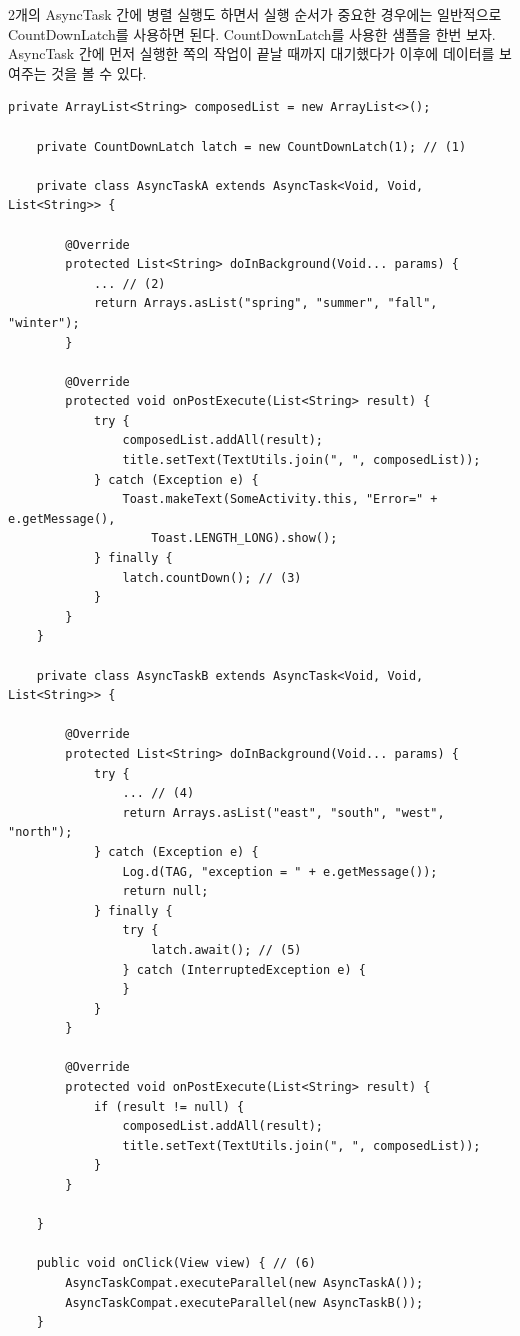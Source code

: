 2개의 AsyncTask 간에 병렬 실행도 하면서 실행 순서가 중요한 경우에는 일반적으로 CountDownLatch를 사용하면 된다.
CountDownLatch를 사용한 샘플을 한번 보자. 
AsyncTask 간에 먼저 실행한 쪽의 작업이 끝날 때까지 대기했다가 이후에 데이터를 보여주는 것을 볼 수 있다.
\begin{lstlisting}[frame=single]
	private ArrayList<String> composedList = new ArrayList<>();

	private CountDownLatch latch = new CountDownLatch(1); // (1)

	private class AsyncTaskA extends AsyncTask<Void, Void, List<String>> {

		@Override
		protected List<String> doInBackground(Void... params) {
			... // (2)
			return Arrays.asList("spring", "summer", "fall", "winter"); 
		}

		@Override
		protected void onPostExecute(List<String> result) {
			try {
				composedList.addAll(result);
				title.setText(TextUtils.join(", ", composedList));
			} catch (Exception e) {
				Toast.makeText(SomeActivity.this, "Error=" + e.getMessage(), 
					Toast.LENGTH_LONG).show();
			} finally {
				latch.countDown(); // (3)
			}
		}
	}

	private class AsyncTaskB extends AsyncTask<Void, Void, List<String>> {

		@Override
		protected List<String> doInBackground(Void... params) {
			try {
				... // (4)
				return Arrays.asList("east", "south", "west", "north"); 
			} catch (Exception e) {
				Log.d(TAG, "exception = " + e.getMessage());
				return null;
			} finally {
				try {
					latch.await(); // (5)
				} catch (InterruptedException e) {
				}
			}
		}

		@Override
		protected void onPostExecute(List<String> result) {
			if (result != null) {
				composedList.addAll(result);
				title.setText(TextUtils.join(", ", composedList));
			}
		}

	}

	public void onClick(View view) { // (6)
		AsyncTaskCompat.executeParallel(new AsyncTaskA());
		AsyncTaskCompat.executeParallel(new AsyncTaskB());
	}
\end{lstlisting}
